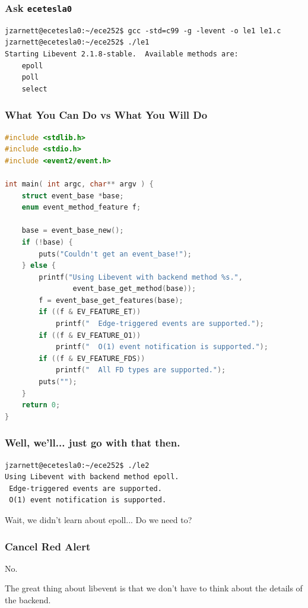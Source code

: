 \begin{frame}[fragile]
\frametitle{Ask \texttt{ecetesla0}}

{\small
\begin{verbatim}
jzarnett@ecetesla0:~/ece252$ gcc -std=c99 -g -levent -o le1 le1.c
jzarnett@ecetesla0:~/ece252$ ./le1 
Starting Libevent 2.1.8-stable.  Available methods are:
    epoll
    poll
    select
\end{verbatim}
}

\end{frame}

\begin{frame}[fragile]
\frametitle{What You Can Do vs What You Will Do}

\begin{lstlisting}[language=C]
#include <stdlib.h>
#include <stdio.h>
#include <event2/event.h>

int main( int argc, char** argv ) { 
    struct event_base *base;
    enum event_method_feature f;

    base = event_base_new();
    if (!base) {
        puts("Couldn't get an event_base!");
    } else {
        printf("Using Libevent with backend method %s.",
                event_base_get_method(base));
        f = event_base_get_features(base);
        if ((f & EV_FEATURE_ET))
            printf("  Edge-triggered events are supported.");
        if ((f & EV_FEATURE_O1))
            printf("  O(1) event notification is supported.");
        if ((f & EV_FEATURE_FDS))
            printf("  All FD types are supported.");
        puts("");
    }   
    return 0;
}
\end{lstlisting}


\end{frame}

\begin{frame}[fragile]
\frametitle{Well, we'll... just go with that then.}

\begin{verbatim}
jzarnett@ecetesla0:~/ece252$ ./le2
Using Libevent with backend method epoll.  
 Edge-triggered events are supported.  
 O(1) event notification is supported.
\end{verbatim}

Wait, we didn't learn about epoll... Do we need to?

\end{frame}


\begin{frame}
\frametitle{Cancel Red Alert}

No.

The great thing about libevent is that we don't have to think about the details of the backend.


\end{frame}


